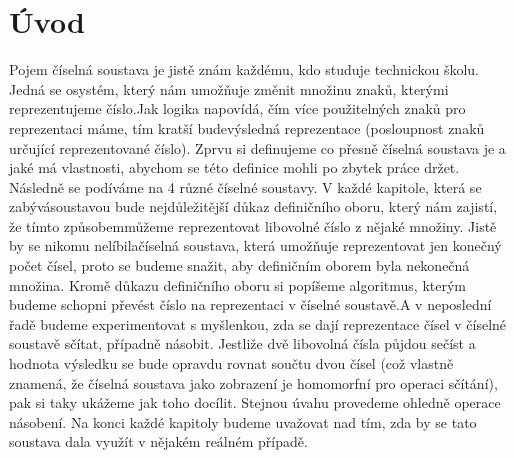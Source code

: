 \documentclass[czech,bachelor,dept470,male]{diploma}
\begin{document}
\MakeTitlePages
\section{Úvod}
Pojem číselná soustava je jistě znám každému, kdo studuje technickou školu. Jedná se o\newline systém, který nám umožňuje změnit množinu znaků, kterými reprezentujeme číslo.\newline Jak logika napovídá, čím více použitelných znaků pro reprezentaci máme, tím kratší bude\newline výsledná reprezentace (posloupnost znaků určující reprezentované číslo). Zprvu si definujeme co přesně číselná soustava je a jaké má vlastnosti, abychom se této definice mohli po zbytek práce držet. Následně se podíváme na 4 různé číselné soustavy. V každé kapitole, která se zabývá\newline soustavou bude nejdůležitější důkaz definičního oboru, který nám zajistí, že tímto způsobem\newline můžeme reprezentovat libovolné číslo z nějaké množiny. Jistě by se nikomu nelíbila\newline číselná soustava, která umožňuje reprezentovat jen konečný počet čísel, proto se budeme snažit, aby definičním oborem byla nekonečná množina. Kromě důkazu definičního oboru si popíšeme algoritmus, kterým budeme schopni převést číslo na reprezentaci v číselné soustavě.\newline A v neposlední řadě budeme experimentovat s myšlenkou, zda se dají reprezentace čísel v číselné soustavě sčítat, případně násobit. Jestliže dvě libovolná čísla půjdou sečíst a hodnota výsledku se bude opravdu rovnat součtu dvou čísel (což vlastně znamená, že číselná soustava jako zobrazení je homomorfní pro operaci sčítání), pak si taky ukážeme jak toho docílit. Stejnou úvahu provedeme ohledně operace násobení. Na konci každé kapitoly budeme uvažovat nad tím, zda by se tato soustava dala využít v nějakém reálném případě.\newpage
\end{document}
